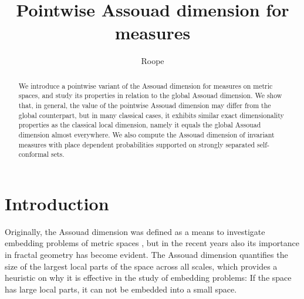 \documentclass{PRM}
\theoremstyle{plain}
\theoremstyle{definition}
\theoremstyle{remark}
\begin{document}
\title{Pointwise Assouad dimension for measures}

\author{Roope }

\address{Research Unit of Mathematical Sciences\\  P.O.Box 8000, FI-90014, University of Oulu, Finland }

\begin{abstract}
    We introduce a pointwise variant of the Assouad dimension for measures on metric spaces, and study its properties in relation to the global Assouad dimension. We show that, in general, the value of the pointwise Assouad dimension may differ from the global counterpart, but in many classical cases, it exhibits similar exact dimensionality properties as the classical local dimension, namely it equals the global Assouad dimension almost everywhere. We also compute the Assouad dimension of invariant measures with place dependent probabilities supported on strongly separated self-conformal sets. 
\end{abstract}




\maketitle

\section{Introduction}
Originally, the Assouad dimension was defined as a means to investigate embedding problems of metric spaces \cite{A,T}, but in the recent years also its importance in fractal geometry has become evident. The Assouad dimension quantifies the size of the largest local parts of the space across all scales, which provides a heuristic on why it is effective in the study of embedding problems: If the space has large local parts, it can not be embedded into a small space.
\end{document}
